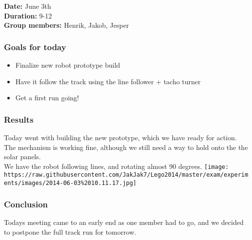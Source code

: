 \textbf{Date:} June 3th\\\textbf{Duration:} 9-12\\\textbf{Group
members:} Henrik, Jakob, Jesper

\subsubsection{Goals for today}

\begin{itemize}
\itemsep1pt\parskip0pt
\item
  Finalize new robot prototype build
\item
  Have it follow the track using the line follower + tacho turner
\item
  Get a first run going!
\end{itemize}

\subsubsection{Results}

Today went with building the new prototype, which we have ready for
action. The mechanism is working fine, although we still need a way to
hold onto the the solar panels.\\We have the robot following lines, and
rotating almost 90 degrees.
\texttt{[image: https://raw.githubusercontent.com/JakJak7/Lego2014/master/exam/experiments/images/2014-06-03\%2010.11.17.jpg]}

\subsubsection{Conclusion}

Todays meeting came to an early end as one member had to go, and we
decided to postpone the full track run for tomorrow.

